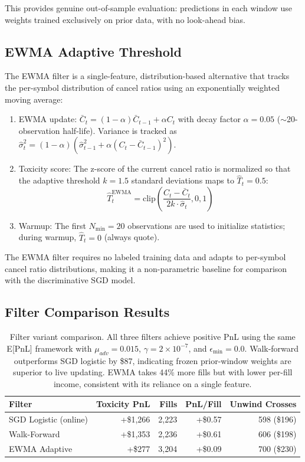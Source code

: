 \documentclass[11pt]{article}
\theoremstyle{definition}
\begin{document}
This provides genuine out-of-sample evaluation: predictions in each window use weights trained exclusively on prior data, with no look-ahead bias.

\subsection{EWMA Adaptive Threshold}

The EWMA filter is a single-feature, distribution-based alternative that tracks the per-symbol distribution of cancel ratios using an exponentially weighted moving average:

\begin{enumerate}
\item EWMA update: $\bar{C}_t = (1-\alpha) \bar{C}_{t-1} + \alpha C_t$ with decay factor $\alpha = 0.05$ ($\sim$20-observation half-life). Variance is tracked as $\hat{\sigma}_t^2 = (1-\alpha)(\hat{\sigma}_{t-1}^2 + \alpha (C_t - \bar{C}_{t-1})^2)$.
\item Toxicity score: The z-score of the current cancel ratio is normalized so that the adaptive threshold $k = 1.5$ standard deviations maps to $\hat{T}_t = 0.5$:
\begin{equation}
\hat{T}_t^{\text{EWMA}} = \text{clip}\left(\frac{C_t - \bar{C}_t}{2k \cdot \hat{\sigma}_t}, 0, 1\right)
\end{equation}
\item Warmup: The first $N_{\text{min}} = 20$ observations are used to initialize statistics; during warmup, $\hat{T}_t = 0$ (always quote).
\end{enumerate}

The EWMA filter requires no labeled training data and adapts to per-symbol cancel ratio distributions, making it a non-parametric baseline for comparison with the discriminative SGD model.

\subsection{Filter Comparison Results}

\begin{table}[H]
\centering
\begin{tabular}{lrrrr}
\toprule
\textbf{Filter} & \textbf{Toxicity PnL} & \textbf{Fills} & \textbf{PnL/Fill} & \textbf{Unwind Crosses} \\
\midrule
SGD Logistic (online) & +\$1,266 & 2,223 & +\$0.57 & 598 (\$196) \\
Walk-Forward & +\$1,353 & 2,236 & +\$0.61 & 606 (\$198) \\
EWMA Adaptive & +\$277 & 3,204 & +\$0.09 & 700 (\$230) \\
\bottomrule
\end{tabular}
\caption{Filter variant comparison. All three filters achieve positive PnL using the same E[PnL] framework with $\mu_{adv} = 0.015$, $\gamma = 2 \times 10^{-7}$, and $\epsilon_{\min} = 0.0$. Walk-forward outperforms SGD logistic by \$87, indicating frozen prior-window weights are superior to live updating. EWMA takes 44\% more fills but with lower per-fill income, consistent with its reliance on a single feature.}
\label{tab:filter_comparison}
\end{table}
\end{document}
